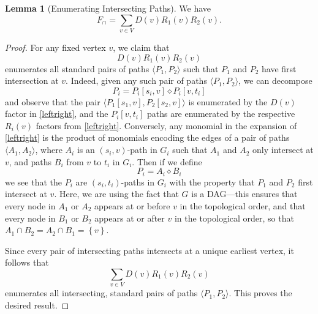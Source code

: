 \documentclass[11pt]{article}
\newcommand{\set}[1]{\left\{#1\right\}}
\newcommand{\dia}{\diamond}
\theoremstyle{definition}
\newtheorem{lemma}[theorem]{Lemma}
\begin{document}
\begin{lemma}[Enumerating Intersecting Paths]
    \label{lem:DAG-disj-poly}
    We have 
        \[F_{\cap} =  \sum_{v\in V} D(v)R_1(v)R_2(v).\]
\end{lemma}
\begin{proof}        
For any fixed vertex $v$, we claim that 
            \begin{equation}
            \label{leftright}
            D(v)R_1(v)R_2(v)
            \end{equation}
        enumerates all standard pairs of paths $\langle P_1,P_2\rangle$ such that $P_1$ and $P_2$ have first  intersection at $v$.
        Indeed, given any such pair of paths $\langle P_1,P_2\rangle$, we can decompose
            \[P_i = P_i[s_i,v]\dia P_i[v,t_i]\]
        and observe that the pair $\langle P_1[s_1,v],P_2[s_2,v]\rangle$ is enumerated by the $D(v)$ factor in \cref{leftright}, and the $P_i[v,t_i]$ paths are enumerated by the respective $R_i(v)$ factors from \cref{leftright}.
        Conversely, any monomial in the expansion of \cref{leftright} is the product of monomials encoding the edges of a pair of paths $\langle A_1,A_2\rangle$, where $A_i$ is an $(s_i,v)$-path in $G_i$ such that $A_1$ and $A_2$ only intersect at $v$, and paths $B_i$ from $v$ to $t_i$ in $G_i$.
        Then if we define 
            \[P_i = A_i\dia B_i\]
        we see that the $P_i$ are $(s_i,t_i)$-paths in $G_i$ with the property that $P_1$ and $P_2$ first intersect at $v$.
        Here, we are using the fact that $G$ is a DAG---this ensures that every node in $A_1$ or $A_2$ appears at or before $v$ in the topological order, and that every node in $B_1$ or $B_2$ appears at or after $v$ in the topological order, so that 
        $A_1\cap B_2 = A_2\cap B_1 = \set{v}$.

        Since every pair of intersecting paths intersects at a unique earliest vertex, it follows that 
        \[\sum_{v\in V} D(v)R_1(v)R_2(v)\]
        enumerates all intersecting, standard pairs of paths $\langle P_1,P_2\rangle$.
        This proves the desired result.
\end{proof}
\end{document}
